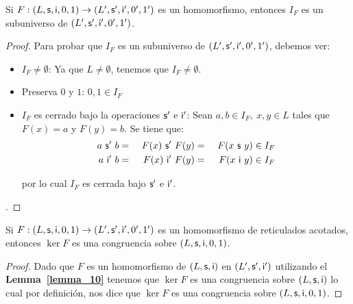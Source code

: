   \begin{lemma} \label{lemma_13}
    \PN Si $F: (L, \mathsf{s}, \mathsf{i}, 0, 1) \rightarrow (L^{\prime}, \mathsf{s}^{\prime}, \mathsf{i}^{\prime}, 0^{\prime}, 1^{\prime})$ es un homomorfismo, entonces $I_{F}$ es un subuniverso de $(L^{\prime}, \mathsf{s}^{\prime}, \mathsf{i}^{\prime}, 0^{\prime}, 1^{\prime})$.
  \end{lemma}
  \begin{proof}
    \PN Para probar que $I_{F}$ es un subuniverso de $(L^{\prime}, \mathsf{s}^{\prime}, \mathsf{i}^{\prime}, 0^{\prime}, 1^{\prime})$, debemos ver:
    \begin{itemize}
      \item $I_{F} \neq \emptyset$: Ya que $L \neq \emptyset$, tenemos que $I_{F} \neq \emptyset$.
      \item Preserva $0$ y $1$: $0, 1 \in I_{F}$
      \item $I_{F}$ es cerrado bajo la operaciones $\mathsf{s}^{\prime}$ e $\mathsf{i}^{\prime}$: Sean $a, b \in I_{F}, \ x, y \in L$
      tales que $F(x) = a$ y $F(y) = b$. Se tiene que:
      \begin{alignat*}{3}
        a \ \mathsf{s}^{\prime} \ b &=& \ F(x) \ \mathsf{s}^{\prime} \ F(y) &=& \ F(x \ \mathsf{s} \ y) \in I_{F} \\
        a \ \mathsf{i}^{\prime} \ b &=& \ F(x) \ \mathsf{i}^{\prime} \ F(y) &=& \ F(x \ \mathsf{i} \ y) \in I_{F}
      \end{alignat*}

      \PN por lo cual $I_{F}$ es cerrada bajo $\mathsf{s}^{\prime}$ e $\mathsf{i}^{\prime}$.
    \end{itemize}.
  \end{proof}

  \begin{lemma} \label{lemma_14}
    \PN Si $F: (L, \mathsf{s}, \mathsf{i}, 0, 1) \rightarrow (L^{\prime}, \mathsf{s}^{\prime}, \mathsf{i}^{\prime}, 0^{\prime}, 1^{\prime})$ es un homomorfismo de reticulados acotados, entonces $\ker F$ es una
    congruencia sobre $(L, \mathsf{s}, \mathsf{i}, 0, 1)$.
  \end{lemma}
  \begin{proof}
    \PN Dado que $F$ es un homomorfismo de $(L, \mathsf{s}, \mathsf{i})$ en $ (L^{\prime}, \mathsf{s}^{\prime}, \mathsf{i}^{\prime})$ utilizando el \textbf{Lemma~\ref{lemma_10}} tenemos
    que $\ker F$ es una congruencia sobre $(L, \mathsf{s}, \mathsf{i})$ lo cual por definición, nos dice que $\ker F$ es una congruencia sobre
    $(L, \mathsf{s}, \mathsf{i}, 0, 1)$.
  \end{proof}

